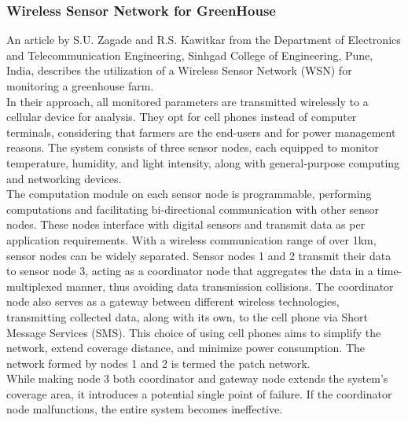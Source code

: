 \documentclass[12pt, a4paper]{article}
\begin{document}
\subsubsection{Wireless Sensor Network for GreenHouse}
An article by S.U. Zagade and R.S. Kawitkar  \cite{zagade2012wireless} from the Department of Electronics and Telecommunication Engineering, Sinhgad College of Engineering, Pune, India, describes the utilization of a Wireless Sensor Network (WSN) for monitoring a greenhouse farm.\\
In their approach, all monitored parameters are transmitted wirelessly to a cellular device for analysis. They opt for cell phones instead of computer terminals, considering that farmers are the end-users and for power management reasons. The system consists of three sensor nodes, each equipped to monitor temperature, humidity, and light intensity, along with general-purpose computing and networking devices.\\
The computation module on each sensor node is programmable, performing computations and facilitating bi-directional communication with other sensor nodes. These nodes interface with digital sensors and transmit data as per application requirements. With a wireless communication range of over 1km, sensor nodes can be widely separated. Sensor nodes 1 and 2 transmit their data to sensor node 3, acting as a coordinator node that aggregates the data in a time-multiplexed manner, thus avoiding data transmission collisions. The coordinator node also serves as a gateway between different wireless technologies, transmitting collected data, along with its own, to the cell phone via Short Message Services (SMS). This choice of using cell phones aims to simplify the network, extend coverage distance, and minimize power consumption. The network formed by nodes 1 and 2 is termed the patch network.\\
While making node 3 both coordinator and gateway node extends the system's coverage area, it introduces a potential single point of failure. If the coordinator node malfunctions, the entire system becomes ineffective.
\end{document}
